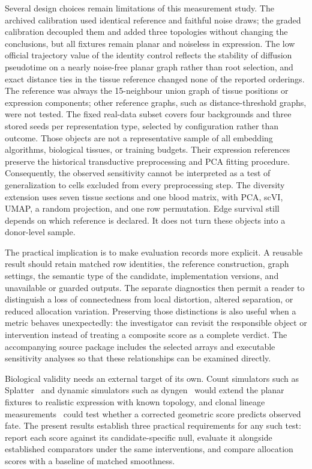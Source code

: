 \documentclass[11pt]{article}
\begin{document}
Several design choices remain limitations of this measurement study. The archived calibration used identical reference and faithful noise draws; the graded calibration decoupled them and added three topologies without changing the conclusions, but all fixtures remain planar and noiseless in expression. The low official trajectory value of the identity control reflects the stability of diffusion pseudotime on a nearly noise-free planar graph rather than root selection, and exact distance ties in the tissue reference changed none of the reported orderings. The reference was always the 15-neighbour union graph of tissue positions or expression components; other reference graphs, such as distance-threshold graphs, were not tested. The fixed real-data subset covers four backgrounds and three stored seeds per representation type, selected by configuration rather than outcome. Those objects are not a representative sample of all embedding algorithms, biological tissues, or training budgets. Their expression references preserve the historical transductive preprocessing and PCA fitting procedure. Consequently, the observed sensitivity cannot be interpreted as a test of generalization to cells excluded from every preprocessing step. The diversity extension uses seven tissue sections and one blood matrix, with PCA, scVI, UMAP, a random projection, and one row permutation. Edge survival still depends on which reference is declared. It does not turn these objects into a donor-level sample.

The practical implication is to make evaluation records more explicit. A reusable result should retain matched row identities, the reference construction, graph settings, the semantic type of the candidate, implementation versions, and unavailable or guarded outputs. The separate diagnostics then permit a reader to distinguish a loss of connectedness from local distortion, altered separation, or reduced allocation variation. Preserving those distinctions is also useful when a metric behaves unexpectedly: the investigator can revisit the responsible object or intervention instead of treating a composite score as a complete verdict. The accompanying source package includes the selected arrays and executable sensitivity analyses so that these relationships can be examined directly.

Biological validity needs an external target of its own. Count simulators such as Splatter~\cite{zappia2017splatter} and dynamic simulators such as dyngen~\cite{cannoodt2021dyngen} would extend the planar fixtures to realistic expression with known topology, and clonal lineage measurements~\cite{weinreb2020lineage} could test whether a corrected geometric score predicts observed fate. The present results establish three practical requirements for any such test: report each score against its candidate-specific null, evaluate it alongside established comparators under the same interventions, and compare allocation scores with a baseline of matched smoothness.


\FloatBarrier


\end{document}
